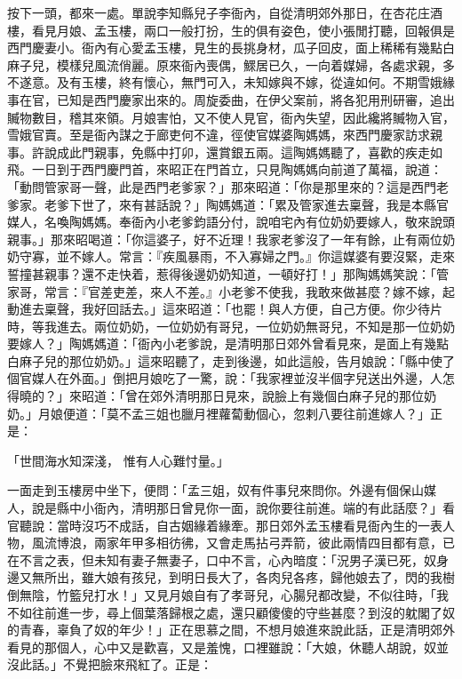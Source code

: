\begin{showcontents}{}
按下一頭，都來一處。單說李知縣兒子李衙內，自從清明郊外那日，在杏花庄酒樓，看見月娘、孟玉樓，兩口一般打扮，生的俱有姿色，使小張閒打聽，回報俱是西門慶妻小。衙內有心愛孟玉樓，見生的長挑身材，瓜子回皮，面上稀稀有幾點白麻子兒，模樣兒風流俏麗。原來衙內喪偶，鰥居已久，一向着媒婦，各處求親，多不遂意。及有玉樓，終有懷心，無門可入，未知嫁與不嫁，從違如何。不期雪娥緣事在官，已知是西門慶家出來的。周旋委曲，在伊父案前，將各犯用刑研審，追出贓物數目，稽其來領。月娘害怕，又不使人見官，衙內失望，因此纔將贓物入官，雪娥官賣。至是衙內謀之于廊吏何不違，徑使官媒婆陶媽媽，來西門慶家訪求親事。許說成此門親事，免縣中打卯，還賞銀五兩。這陶媽媽聽了，喜歡的疾走如飛。一日到于西門慶門首，來昭正在門首立，只見陶媽媽向前道了萬福，說道：「動問管家哥一聲，此是西門老爹家？」那來昭道：「你是那里來的？這是西門老爹家。老爹下世了，來有甚話說？」陶媽媽道：「累及管家進去稟聲，我是本縣官媒人，名喚陶媽媽。奉衙內小老爹鈞語分付，說咱宅內有位奶奶要嫁人，敬來說頭親事。」那來昭喝道：「你這婆子，好不近理！我家老爹沒了一年有餘，止有兩位奶奶守寡，並不嫁人。常言：『疾風暴雨，不入寡婦之門。』你這媒婆有要沒緊，走來誓撞甚親事？還不走快着，惹得後邊奶奶知道，一頓好打！」那陶媽媽笑說：「管家哥，常言：『官差吏差，來人不差。』小老爹不使我，我敢來做甚麼？嫁不嫁，起動進去稟聲，我好回話去。」這來昭道：「也罷！與人方便，自己方便。你少待片時，等我進去。兩位奶奶，一位奶奶有哥兒，一位奶奶無哥兒，不知是那一位奶奶要嫁人？」陶媽媽道：「衙內小老爹說，是清明那日郊外曾看見來，是面上有幾點白麻子兒的那位奶奶。」這來昭聽了，走到後邊，如此這般，告月娘說：「縣中使了個官媒人在外面。」倒把月娘吃了一驚，說：「我家裡並沒半個字兒送出外邊，人怎得曉的？」來昭道：「曾在郊外清明那日見來，說臉上有幾個白麻子兒的那位奶奶。」月娘便道：「莫不孟三姐也臘月裡蘿蔔動個心，忽剌八要往前進嫁人？」正是：

「世間海水知深淺，  惟有人心難忖量。」

一面走到玉樓房中坐下，便問：「孟三姐，奴有件事兒來問你。外邊有個保山媒人，說是縣中小衙內，清明那日曾見你一面，說你要往前進。端的有此話麼？」看官聽說：當時沒巧不成話，自古姻緣着緣牽。那日郊外孟玉樓看見衙內生的一表人物，風流博浪，兩家年甲多相彷彿，又會走馬拈弓弄箭，彼此兩情四目都有意，已在不言之表，但未知有妻子無妻子，口中不言，心內暗度：「況男子漢已死，奴身邊又無所出，雖大娘有孩兒，到明日長大了，各肉兒各疼，歸他娘去了，閃的我樹倒無陰，竹籃兒打水！」又見月娘自有了孝哥兒，心腸兒都改變，不似往時，「我不如往前進一步，尋上個葉落歸根之處，還只顧傻傻的守些甚麼？到沒的躭閣了奴的青春，辜負了奴的年少！」正在思慕之間，不想月娘進來說此話，正是清明郊外看見的那個人，心中又是歡喜，又是羞愧，口裡雖說：「大娘，休聽人胡說，奴並沒此話。」不覺把臉來飛紅了。正是：


\end{showcontents}
